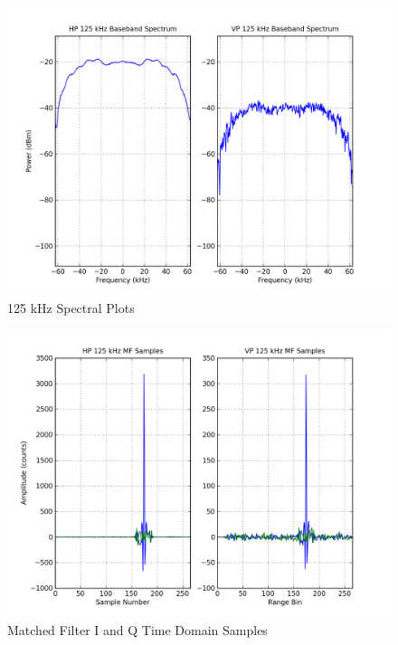 \documentclass[12pt,english]{article}
\begin{document}
\begin{figure}[htb]
  \noindent \begin{centering}
  \includegraphics[width=4.75in]{125kHzSpectrumPT8_AH0_AV0M2.png}\medskip{}
  \caption{125 kHz Spectral Plots}
  \label{fig:125kHzSpectrumPT8_AH0_AV0M2}
  \par \end{centering}
\end{figure}

\begin{figure}[ht]
  \noindent \begin{centering}
  \includegraphics[width=4.75in]{125kHzMatchedFilterPT8_AH0_AV0M2.png}\medskip{}
  \caption{Matched Filter I and Q Time Domain Samples}
  \label{fig:125kHzMatchedFilterPT8_AH0_AV0M2}
  \par \end{centering}
\end{figure}
\end{document}
